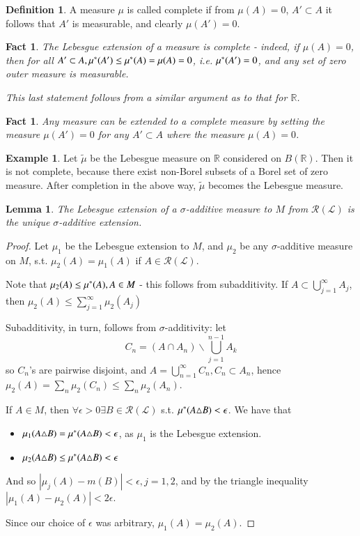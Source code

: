 \documentclass[11pt,a4paper]{report}
\newtheorem{lemma}[theorem]{Lemma}
\theoremstyle{plain}
\newtheorem{fact}[thm]{Fact}
\theoremstyle{definition}
\newtheorem*{defn}{Definition}
\newtheorem*{eg}{Example}
\theoremstyle{remark}
\newcommand{\intersection}{\cap}
\newcommand{\Union}{\bigcup}
\newcommand{\R}{\mathbb{R}}
\newcommand{\cL}{\mathcal{L}}
\newcommand{\cR}{\mathcal{R}}
\newcommand{\abs}[1]{\left| #1 \right|}
\begin{document}
\begin{defn}
  A measure $\mu$ is called complete if from $\mu(A) = 0$, $A' \subset A$ it follows that $A'$ is measurable, and clearly $\mu(A') = 0$.
\end{defn}

\begin{fact}
  The Lebesgue extension of a measure is complete - indeed, if $\mu(A) = 0$, then for all $A' \subset A, \mu^{*}(A') \leq \mu^{*}(A) = \mu(A)= 0$, i.e. $\mu^{*}(A') = 0$, and any set of zero outer measure is measurable.

  This last statement follows from a similar argument as to that for $\R$.
\end{fact}

\begin{fact}
  Any measure can be extended to a complete measure by setting the measure $\mu(A') = 0$ for any $A' \subset A$ where the measure $\mu(A) = 0$.
\end{fact}

\begin{eg}
  Let $\tilde{\mu}$ be the Lebesgue measure on $\R$ considered on $B(\R)$. Then it is not complete, because there exist non-Borel subsets of a Borel set of zero measure. After completion in the above way, $\tilde{\mu}$ becomes the Lebesgue measure.
\end{eg}

\begin{lemma}
  The Lebesgue extension of a $\sigma$-additive measure to $M$ from $\cR(\cL)$ is the unique $\sigma$-additive extension.
\end{lemma}

\begin{proof}
  Let $\mu_1$ be the Lebesgue extension to $M$, and $\mu_2$ be any $\sigma$-additive measure on $M$, s.t. $\mu_2(A) = \mu_1(A)$ if $A \in \cR(\cL)$.

    Note that $\mu_2(A) \leq \mu^{*}(A), A \in M$ - this follows from subadditivity. If $A \subset \Union_{j=1}^\infty A_j$, then $\mu_2(A) \leq \sum_{j=1}^\infty \mu_2(A_j)$
    
    Subadditivity, in turn, follows from $\sigma$-additivity: let $$ C_n = (A \intersection A_n) \backslash \Union_{j=1}^{n-1} A_k$$ so $C_n$'s are pairwise disjoint, and $A = \Union_{n=1}^\infty C_n, C_n \subset A_n$, hence $\mu_2(A) = \sum_n \mu_2(C_n) \leq \sum_n \mu_2(A_n)$.

    If $A \in M$, then $\forall \epsilon > 0 \exists B \in \cR(\cL)$ s.t. $\mu^{*}(A \triangle B) < \epsilon$. We have that 
    \begin{itemize}
        \item $\mu_1(A \triangle B) = \mu^{*}(A \triangle B) < \epsilon$, as $\mu_1$ is the Lebesgue extension.
        \item $\mu_2(A \triangle B) \leq \mu^{*}(A \triangle B) < \epsilon$
    \end{itemize}


    And so $\abs{\mu_j(A) - m(B)} < \epsilon, j = 1, 2$, and by the triangle inequality $\abs{\mu_1(A) - \mu_2(A)} < 2\epsilon$.

    Since our choice of $\epsilon$ was arbitrary, $\mu_1(A) = \mu_2(A)$.
\end{proof}
\end{document}
